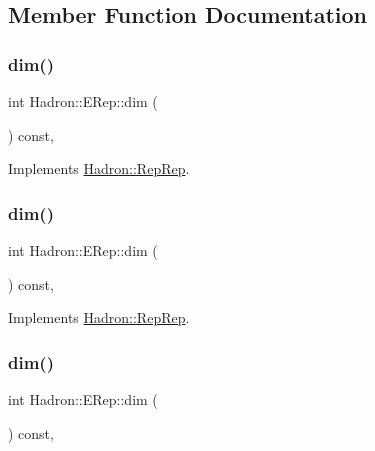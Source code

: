 \subsection{Member Function Documentation}
\mbox{\label{structHadron_1_1ERep_a9eba7fc8ee0562900e00c0755337f103}} 
\subsubsection{\texorpdfstring{dim()}{dim()}\hspace{0.1cm}{\footnotesize\ttfamily [1/5]}}
{\footnotesize\ttfamily int Hadron\+::\+E\+Rep\+::dim (\begin{DoxyParamCaption}{ }\end{DoxyParamCaption}) const\hspace{0.3cm}{\ttfamily [inline]}, {\ttfamily [virtual]}}



Implements \mbox{\hyperlink{structHadron_1_1RepRep_a92c8802e5ed7afd7da43ccfd5b7cd92b}{Hadron\+::\+Rep\+Rep}}.

\mbox{\label{structHadron_1_1ERep_a9eba7fc8ee0562900e00c0755337f103}} 
\subsubsection{\texorpdfstring{dim()}{dim()}\hspace{0.1cm}{\footnotesize\ttfamily [2/5]}}
{\footnotesize\ttfamily int Hadron\+::\+E\+Rep\+::dim (\begin{DoxyParamCaption}{ }\end{DoxyParamCaption}) const\hspace{0.3cm}{\ttfamily [inline]}, {\ttfamily [virtual]}}



Implements \mbox{\hyperlink{structHadron_1_1RepRep_a92c8802e5ed7afd7da43ccfd5b7cd92b}{Hadron\+::\+Rep\+Rep}}.

\mbox{\label{structHadron_1_1ERep_a9eba7fc8ee0562900e00c0755337f103}} 
\subsubsection{\texorpdfstring{dim()}{dim()}\hspace{0.1cm}{\footnotesize\ttfamily [3/5]}}
{\footnotesize\ttfamily int Hadron\+::\+E\+Rep\+::dim (\begin{DoxyParamCaption}{ }\end{DoxyParamCaption}) const\hspace{0.3cm}{\ttfamily [inline]}, {\ttfamily [virtual]}}



